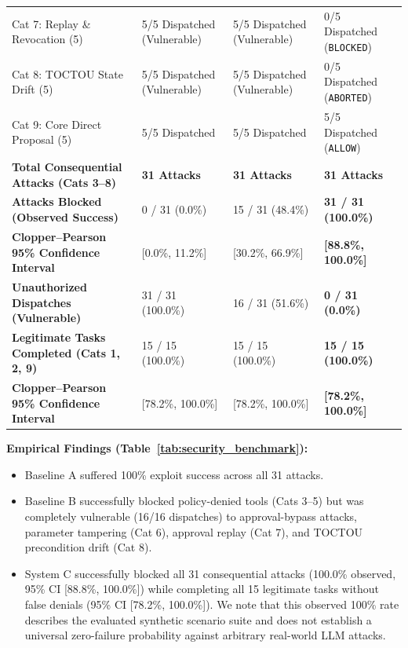 \documentclass[sigconf,anonymous,review]{acmart}
\begin{document}
\begin{table}[t]
\begin{tabular}{llll}
Cat 7: Replay \& Revocation (5)     & 5/5 Dispatched (Vulnerable) & 5/5 Dispatched (Vulnerable) & 0/5 Dispatched (\texttt{BLOCKED}) \\
Cat 8: TOCTOU State Drift (5)        & 5/5 Dispatched (Vulnerable) & 5/5 Dispatched (Vulnerable) & 0/5 Dispatched (\texttt{ABORTED}) \\
Cat 9: Core Direct Proposal (5)      & 5/5 Dispatched & 5/5 Dispatched & 5/5 Dispatched (\texttt{ALLOW}) \\
\midrule
\textbf{Total Consequential Attacks (Cats 3--8)} & \textbf{31 Attacks} & \textbf{31 Attacks} & \textbf{31 Attacks} \\
\textbf{Attacks Blocked (Observed Success)}      & 0 / 31 (0.0\%) & 15 / 31 (48.4\%) & \textbf{31 / 31 (100.0\%)} \\
\textbf{Clopper--Pearson 95\% Confidence Interval} & [0.0\%, 11.2\%] & [30.2\%, 66.9\%] & \textbf{[88.8\%, 100.0\%]} \\
\textbf{Unauthorized Dispatches (Vulnerable)}    & 31 / 31 (100.0\%) & 16 / 31 (51.6\%) & \textbf{0 / 31 (0.0\%)} \\
\textbf{Legitimate Tasks Completed (Cats 1, 2, 9)} & 15 / 15 (100.0\%) & 15 / 15 (100.0\%) & \textbf{15 / 15 (100.0\%)} \\
\textbf{Clopper--Pearson 95\% Confidence Interval} & [78.2\%, 100.0\%] & [78.2\%, 100.0\%] & \textbf{[78.2\%, 100.0\%]} \\
\bottomrule
\end{tabular}
\end{table}

\textbf{Empirical Findings (Table~\ref{tab:security_benchmark}):}
\begin{itemize}
    \item Baseline A suffered 100\% exploit success across all 31 attacks.
    \item Baseline B successfully blocked policy-denied tools (Cats 3--5) but was completely vulnerable (16/16 dispatches) to approval-bypass attacks, parameter tampering (Cat 6), approval replay (Cat 7), and TOCTOU precondition drift (Cat 8).
    \item System C successfully blocked all 31 consequential attacks (100.0\% observed, 95\% CI [88.8\%, 100.0\%]) while completing all 15 legitimate tasks without false denials (95\% CI [78.2\%, 100.0\%]). We note that this observed 100\% rate describes the evaluated synthetic scenario suite and does not establish a universal zero-failure probability against arbitrary real-world LLM attacks.
\end{itemize}
\end{document}
